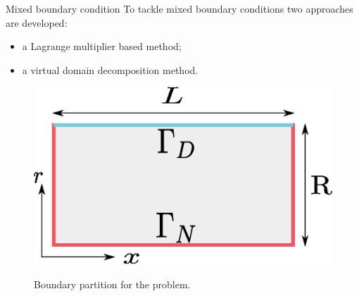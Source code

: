 \documentclass[aspectratio=169]{ISAE-Beamer}
\begin{document}
\begin{frame}{Mixed boundary condition}
To tackle mixed boundary conditions two approaches are developed:
\begin{itemize}
\item a Lagrange multiplier based method;
\item a virtual domain decomposition method.
\end{itemize} 	
\begin{figure}[b]%
\centering
\includegraphics[width=0.4\columnwidth]{presentation/vibroacoustic_boundary_part.eps} \\
\caption[bcpart]{Boundary partition for the problem.}
\end{figure}
\end{frame}
\end{document}
